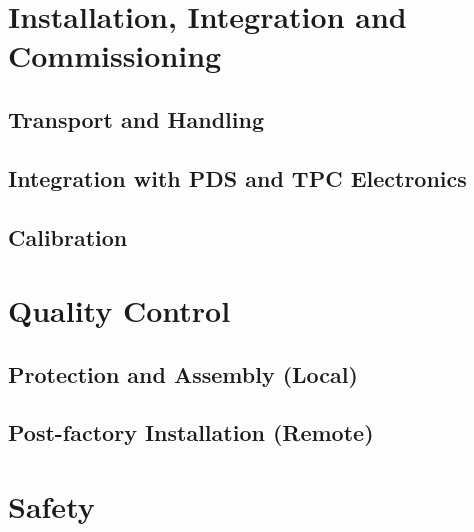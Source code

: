 \section{Installation, Integration and Commissioning}
\label{sec:fdsp-apa-install}

\subsection{Transport and Handling}
\label{sec:fdsp-apa-install-transport}


\subsection{Integration with PDS and TPC Electronics}
\label{sec:fdsp-apa-install-pds-elec}


\subsection{Calibration}
\label{sec:fdsp-apa-install-calib}




\section{Quality Control}
\label{sec:fdsp-apa-qc}

\subsection{Protection and Assembly (Local)}
\label{sec:fdsp-apa-qc-local}


\subsection{Post-factory Installation (Remote)}
\label{sec:fdsp-apa-qc-remote}



\section{Safety}
\label{sec:fdsp-apa-safety}


